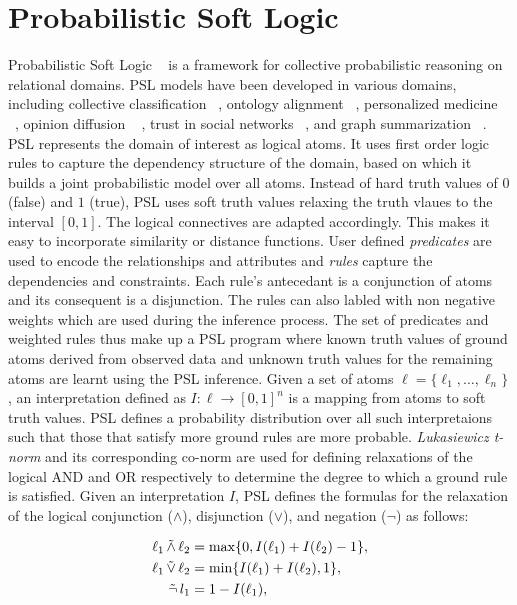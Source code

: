 \section{Probabilistic Soft Logic}
Probabilistic Soft Logic ~\cite{kimmig2012short} is a framework for collective probabilistic reasoning on relational domains.
PSL models have been developed in various domains, including collective classification ~\cite{broecheler2010computing}, ontology alignment ~\cite{brocheler2012probabilistic}, personalized medicine ~\cite{bach2010decision}, opinion diffusion ~\cite{bach2012scaling} , trust in social networks ~\cite{huang2012probabilistic}, and graph summarization ~\cite{memory2012graph}.
PSL represents the domain of interest as logical atoms.
It uses first order logic rules to capture the dependency structure of the domain, based on which it builds a joint probabilistic model over all atoms.
Instead of hard truth values of $0$ (false) and $1$ (true), PSL uses soft truth values relaxing the truth vlaues to the interval $[0,1]$.
The logical connectives are adapted accordingly.
This makes it easy to incorporate similarity or distance functions.
\newline
User defined \emph{predicates} are used to encode the relationships and attributes and \emph{rules} capture the  dependencies and constraints.
Each rule's antecedant is a conjunction of atoms and its consequent is a disjunction. 
The rules can also labled with non negative weights which are used during the inference process. 
The set of predicates and weighted rules thus make up a PSL program where known truth values of ground atoms derived from observed data and unknown truth values for the remaining atoms are learnt using the PSL inference.
\newline
Given a set of atoms 
$\ell = \{\ell_1,\ldots,\ell_n\}$,
an interpretation defined as 
$I : \ell \rightarrow [0,1]^n$
is a mapping from atoms to soft truth values.
PSL defines a probability distribution over all such interpretaions such that those that satisfy more ground rules are more probable.
\emph{Lukasiewicz t-norm} and its corresponding co-norm are used for defining relaxations of the logical AND and OR respectively to determine the degree to which a ground rule is satisfied.
Given an interpretation $\mathit{I}$, PSL defines the formulas for the relaxation of the logical conjunction ($\wedge$), disjunction ($\vee$), and negation ($\neg$) as follows:

\begin{align*}
\ell_1 \softand \ell_2 &= \max\{0, I(\ell_1) + I(\ell_2) - 1\},\\
\ell_1 \softor \ell_2 &= \min\{I(\ell_1) + I(\ell_2), 1\},\\
\softneg l_1 &= 1 - I(\ell_1),
\end{align*}  

